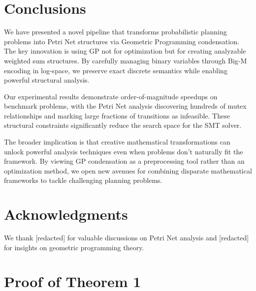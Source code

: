 \documentclass[11pt]{article}
\begin{document}
\section{Conclusions}

We have presented a novel pipeline that transforms probabilistic
planning problems into Petri Net structures via Geometric Programming
condensation. The key innovation is using GP not for optimization but
for creating analyzable weighted sum structures. By carefully managing
binary variables through Big-M encoding in log-space, we preserve
exact discrete semantics while enabling powerful structural analysis.

Our experimental results demonstrate order-of-magnitude speedups on
benchmark problems, with the Petri Net analysis discovering hundreds
of mutex relationships and marking large fractions of transitions as
infeasible. These structural constraints significantly reduce the
search space for the SMT solver.

The broader implication is that creative mathematical transformations
can unlock powerful analysis techniques even when problems don't
naturally fit the framework. By viewing GP condensation as a
preprocessing tool rather than an optimization method, we open new
avenues for combining disparate mathematical frameworks to tackle
challenging planning problems.

\section*{Acknowledgments}

We thank [redacted] for valuable discussions on Petri Net analysis and
[redacted] for insights on geometric programming theory.





\appendix

\section{Proof of Theorem 1}
\end{document}
